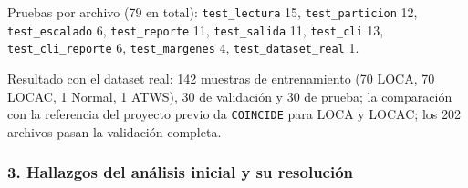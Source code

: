 \documentclass[12pt,a4paper]{article}
\newenvironment{documentogenerado}[2]{%
  \def\doccomando{#1}\def\docruta{#2}%
  \par\begingroup\small\setstretch{1.15}\sloppy%
}{\endgroup\par\medskip}
\begin{document}
\begin{documentogenerado}{/speckit-analyze + /speckit-converge}{specs\slash 001-preparacion-datos\slash auditoria.md}
Pruebas por archivo (79 en total): \texttt{test\_\allowbreak{}lectura} 15, \texttt{test\_\allowbreak{}particion} 12, \texttt{test\_\allowbreak{}escalado} 6, \texttt{test\_\allowbreak{}reporte} 11, \texttt{test\_\allowbreak{}salida} 11, \texttt{test\_\allowbreak{}cli} 13, \texttt{test\_\allowbreak{}cli\_\allowbreak{}reporte} 6, \texttt{test\_\allowbreak{}margenes} 4, \texttt{test\_\allowbreak{}dataset\_\allowbreak{}real} 1.

Resultado con el dataset real: 142 muestras de entrenamiento (70 LOCA, 70 LOCAC, 1 Normal, 1 ATWS), 30 de validación y 30 de prueba; la comparación con la referencia del proyecto previo da \texttt{COINCIDE} para LOCA y LOCAC; los 202 archivos pasan la validación completa.

\subsubsection{3. Hallazgos del análisis inicial y su resolución}


\end{documentogenerado}
\end{document}
